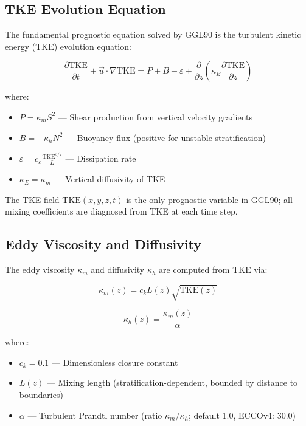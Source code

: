 \documentclass[12pt,letterpaper]{article}
\newcommand{\TKE}{\mathrm{TKE}}
\newcommand{\KM}{\kappa_m}
\newcommand{\KH}{\kappa_h}
\newcommand{\KE}{\kappa_E}
\newcommand{\Nsq}{N^2}
\newcommand{\Ssq}{S^2}
\begin{document}
\subsection{TKE Evolution Equation}

The fundamental prognostic equation solved by GGL90 is the turbulent kinetic energy (TKE) evolution equation:

\begin{equation}
\frac{\partial \TKE}{\partial t} + \vec{u} \cdot \nabla \TKE = P + B - \varepsilon + \frac{\partial}{\partial z}\left(\KE \frac{\partial \TKE}{\partial z}\right)
\end{equation}

where:
\begin{itemize}
\item $P = \KM \Ssq$ --- Shear production from vertical velocity gradients
\item $B = -\KH \Nsq$ --- Buoyancy flux (positive for unstable stratification)
\item $\varepsilon = c_\varepsilon \frac{\TKE^{3/2}}{L}$ --- Dissipation rate
\item $\KE = \KM$ --- Vertical diffusivity of TKE
\end{itemize}

The TKE field $\TKE(x,y,z,t)$ is the only prognostic variable in GGL90; all mixing coefficients are diagnosed from TKE at each time step.

\subsection{Eddy Viscosity and Diffusivity}

The eddy viscosity $\KM$ and diffusivity $\KH$ are computed from TKE via:

\begin{equation}
\KM(z) = c_k L(z) \sqrt{\TKE(z)}
\end{equation}

\begin{equation}
\KH(z) = \frac{\KM(z)}{\alpha}
\end{equation}

where:
\begin{itemize}
\item $c_k = 0.1$ --- Dimensionless closure constant
\item $L(z)$ --- Mixing length (stratification-dependent, bounded by distance to boundaries)
\item $\alpha$ --- Turbulent Prandtl number (ratio $\KM/\KH$; default 1.0, ECCOv4: 30.0)
\end{itemize}
\end{document}
